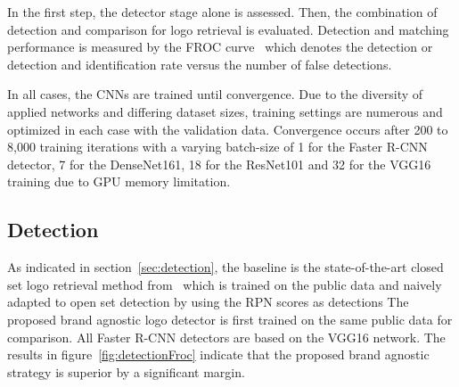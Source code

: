 \documentclass[a4paper,twoside]{article}
\begin{document}
In the first step, the detector stage alone is assessed. Then, the combination of detection and comparison for logo retrieval is evaluated. 
Detection and matching performance is measured by the \ac{FROC} curve~\cite{miller1969} which denotes the detection or detection and identification rate versus the number of false detections.

In all cases, the \acp{CNN} are trained until convergence. Due to the diversity of applied networks and differing dataset sizes, training settings are numerous and optimized in each case with the validation data. Convergence occurs after 200 to 8,000 training iterations with a varying batch-size of 1 for the Faster R-CNN detector, 7 for the DenseNet161, 18 for the ResNet101 and 32 for the VGG16 training due to GPU memory limitation.

\subsection{Detection}
As indicated in section~\ref{sec:detection}, the baseline is the state-of-the-art closed set logo retrieval method from~\cite{su2016} which is trained on the public data and naively adapted to open set detection by using the \ac{RPN} scores as detections
The proposed brand agnostic logo detector is first trained on the same public data for comparison. All Faster R-CNN detectors are based on the VGG16 network.
The results in figure~\ref{fig:detectionFroc} indicate that the proposed brand agnostic strategy is superior by a significant margin. 
%
\end{document}
